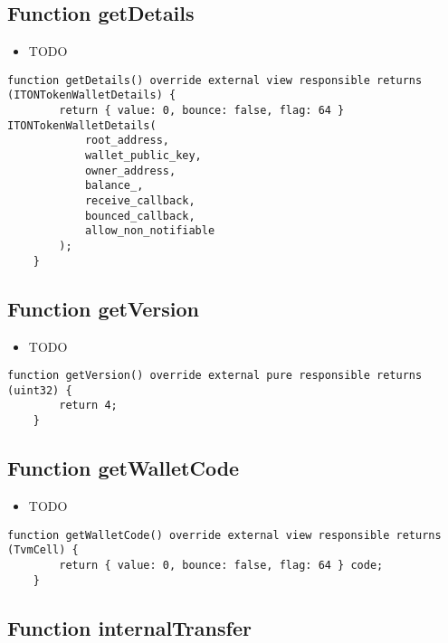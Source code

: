 \subsection{Function getDetails}

\noindent\begin{itemize}
\item TODO
\end{itemize}

\begin{lstlisting}[firstnumber=72]
    function getDetails() override external view responsible returns (ITONTokenWalletDetails) {
        return { value: 0, bounce: false, flag: 64 } ITONTokenWalletDetails(
            root_address,
            wallet_public_key,
            owner_address,
            balance_,
            receive_callback,
            bounced_callback,
            allow_non_notifiable
        );
    }
\end{lstlisting}

\subsection{Function getVersion}

\noindent\begin{itemize}
\item TODO
\end{itemize}

\begin{lstlisting}[firstnumber=54]
    function getVersion() override external pure responsible returns (uint32) {
        return 4;
    }
\end{lstlisting}

\subsection{Function getWalletCode}

\noindent\begin{itemize}
\item TODO
\end{itemize}

\begin{lstlisting}[firstnumber=87]
    function getWalletCode() override external view responsible returns (TvmCell) {
        return { value: 0, bounce: false, flag: 64 } code;
    }
\end{lstlisting}

\subsection{Function internalTransfer}

